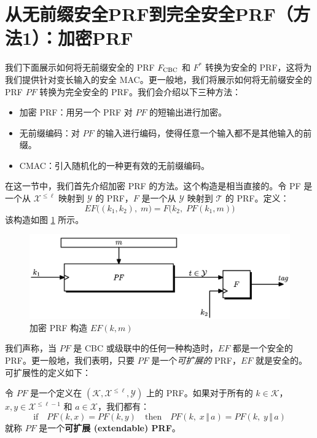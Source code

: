 \section{从无前缀安全PRF到完全安全PRF（方法1）：加密PRF}\label{sec:6-5}

我们下面展示如何将无前缀安全的 PRF $F_{\rm CBC}$ 和 $F^*$ 转换为安全的 PRF，这将为我们提供针对变长输入的安全 MAC。更一般地，我们将展示如何将无前缀安全的 PRF $PF$ 转换为完全安全的 PRF。我们会介绍以下三种方法：
\begin{itemize}
	\item 加密 PRF：用另一个 PRF 对 $PF$ 的短输出进行加密。
	\item 无前缀编码：对 $PF$ 的输入进行编码，使得任意一个输入都不是其他输入的前缀。
	\item CMAC：引入随机化的一种更有效的无前缀编码。
\end{itemize}
在这一节中，我们首先介绍加密 PRF 的方法。这个构造是相当直接的。令 PF 是一个从 $\mathcal{X}^{\leq\ell}$ 映射到 $\mathcal{Y}$ 的 PRF，$F$ 是一个从 $\mathcal{Y}$ 映射到 $\mathcal{T}$ 的 PRF。定义：
\begin{equation}\label{eq:6-17}
EF\big((k_1,k_2),\;m\big)=F\big(k_2,\;PF(k_1,m)\big)
\end{equation}
该构造如图 \ref{fig:6-4} 所示。

\begin{figure}
  \centering
  \includegraphics[width=0.65\linewidth]{figures/chapter6/fig4.png}
  \caption{加密 PRF 构造 $EF(k,m)$}
  \label{fig:6-4}
\end{figure}

我们声称，当 $PF$ 是 CBC 或级联中的任何一种构造时，$EF$ 都是一个安全的 PRF。更一般地，我们表明，只要 $PF$ 是一个\emph{可扩展的} PRF，$EF$ 就是安全的。可扩展性的定义如下：

\begin{definition}\label{def:6-4}
令 $PF$ 是一个定义在 $(\mathcal{K},\mathcal{X}^{\leq\ell},\mathcal{Y})$ 上的 PRF。如果对于所有的 $k\in\mathcal{K}$，$x,y\in\mathcal{X}^{\leq\ell-1}$ 和 $a\in\mathcal{X}$，我们都有：
\[
\text{if}\quad
PF(k,x)=PF(k,y)
\quad\text{then}\quad
PF(k,\;x\,\Vert\,a)=PF(k,\;y\,\Vert\,a)
\]
就称 $PF$ 是一个\textbf{可扩展 (extendable) PRF}。
\end{definition}

